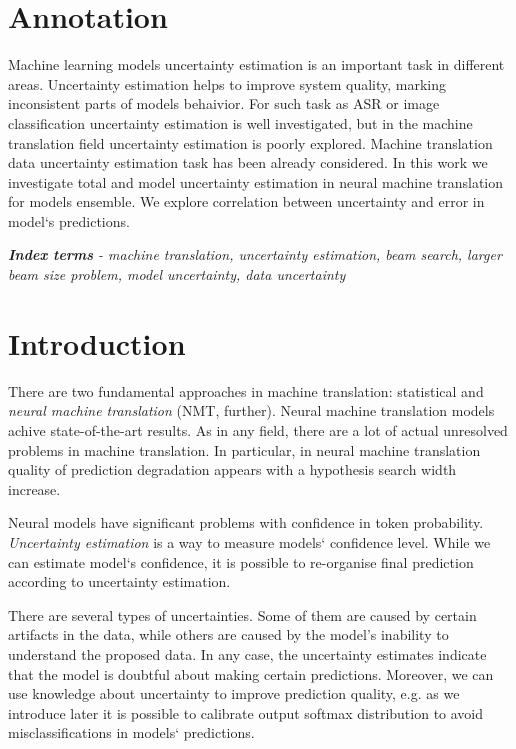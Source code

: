 \documentclass[a4paper,14pt]{extarticle}
\begin{document}
	\newpage

	{
		\hypersetup{linkcolor=black}
		\tableofcontents
	}

	\newpage
	
	\section{Annotation}
	Machine learning models uncertainty estimation is an important task in different areas. Uncertainty estimation helps to improve system quality, marking inconsistent parts of models behaivior. For such task as ASR or image classification uncertainty estimation is well investigated, but in the machine translation field uncertainty estimation is poorly explored. Machine translation data uncertainty estimation task has been already considered. In this work we investigate total and model uncertainty estimation in neural machine translation for models ensemble. We explore correlation between uncertainty and error in model`s predictions.
	
	\textit{\textbf{Index terms} - machine translation, uncertainty estimation, beam search, larger beam size problem, model uncertainty, data uncertainty}
		
	\newpage
		
	\section{Introduction}
	There are two fundamental approaches in machine translation: statistical and \textit{neural machine translation} (NMT, further). Neural machine translation models achive state-of-the-art results. As in any field, there are a lot of actual unresolved problems in machine translation. In particular, in neural machine translation  quality of prediction degradation appears with a hypothesis search width increase.
	
	Neural models have significant problems with confidence in token probability. \textit{Uncertainty estimation} is a way to measure models` confidence level. While we can estimate model`s confidence, it is possible to re-organise final prediction according to uncertainty estimation.
	
	There are several types of uncertainties. Some of them are caused by certain artifacts in the data, while others are caused by the model's inability to understand the proposed data. In any case, the uncertainty estimates indicate that the model is doubtful about making certain predictions.	Moreover, we can use knowledge about uncertainty to improve prediction quality, e.g. as we introduce later it is possible to calibrate output softmax distribution to avoid misclassifications in models` predictions.
	
\end{document}
